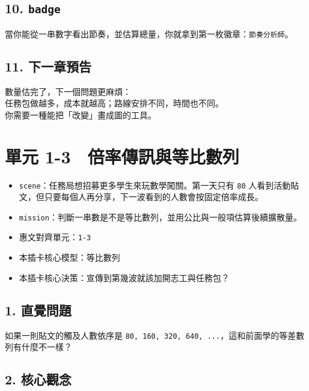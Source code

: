 \documentclass[
  chinese,
  12pt,
  a4paper,
  oneside]{article}
\providecommand{\tightlist}{%
  \setlength{\itemsep}{0pt}\setlength{\parskip}{0pt}}
\begin{document}
\subsection{\texorpdfstring{10. \texttt{badge}}{10. badge}}\label{badge}

當你能從一串數字看出節奏，並估算總量，你就拿到第一枚徽章：\texttt{節奏分析師}。

\subsection{11. 下一章預告}\label{ux4e0bux4e00ux7ae0ux9810ux544a}

數量估完了，下一個問題更麻煩：\\
任務包做越多，成本就越高；路線安排不同，時間也不同。\\
你需要一種能把「改變」畫成圖的工具。

\newpage

\section{單元
1-3　倍率傳訊與等比數列}\label{ux55aeux5143-1-3-ux500dux7387ux50b3ux8a0aux8207ux7b49ux6bd4ux6578ux5217}

\begin{itemize}
\tightlist
\item
  \texttt{scene}：任務局想招募更多學生來玩數學闖關。第一天只有
  \texttt{80}
  人看到活動貼文，但只要每個人再分享，下一波看到的人數會按固定倍率成長。
\item
  \texttt{mission}：判斷一串數是不是等比數列，並用公比與一般項估算後續擴散量。
\item
  惠文對齊單元：\texttt{1-3}
\item
  本插卡核心模型：等比數列
\item
  本插卡核心決策：宣傳到第幾波就該加開志工與任務包？
\end{itemize}

\subsection{1. 直覺問題}\label{ux76f4ux89baux554fux984c-1}

如果一則貼文的觸及人數依序是
\texttt{80,\ 160,\ 320,\ 640,\ ...}，這和前面學的等差數列有什麼不一樣？

\subsection{2. 核心觀念}\label{ux6838ux5fc3ux89c0ux5ff5}
\end{document}
